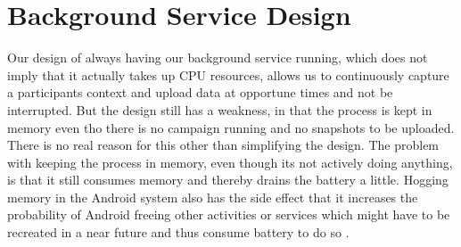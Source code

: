 
\section{Background Service Design}
\label{sec:background_service_design}

Our design of always having our background service running, which does not imply that it actually takes up CPU resources, allows us to continuously capture a participants context and upload data at opportune times and not be interrupted. But the design still has a weakness, in that the process is kept in memory even tho there is no campaign running and no snapshots to be uploaded. There is no real reason for this other than simplifying the design. The problem with keeping the process in memory, even though its not actively doing anything, is that it still consumes memory and thereby drains the battery a little. Hogging memory in the Android system also has the side effect that it increases the probability of Android freeing other activities or services which might have to be recreated in a near future and thus consume battery to do so \parencite{android_memory_management}.  